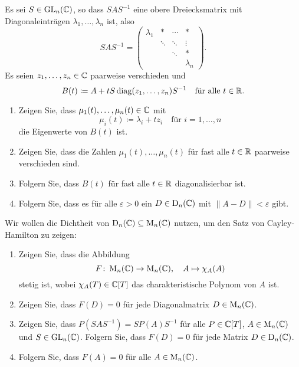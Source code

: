 \documentclass[a4paper,10pt]{scrartcl}
\begin{document}
\begin{question}
  Es sei $S \in \operatorname{GL}_n(\mathbb{C})$, so dass $S A S^{-1}$ eine obere Dreiecksmatrix mit Diagonaleinträgen $\lambda_1, \dotsc, \lambda_n$ ist, also
  \[
    S A S^{-1}
    =
    \begin{pmatrix}
      \lambda_1 & *       & \cdots  & *         \\
                & \ddots  & \ddots  & \vdots    \\
                &         & \ddots  & *         \\
                &         &         & \lambda_n
    \end{pmatrix}.
  \]
  Es seien $z_1, \dotsc, z_n \in \mathbb{C}$ paarweise verschieden und
  \[
    B(t)
    \coloneqq
    A + t S \operatorname{\operatorname{diag}}(z_1, \dotsc, z_n) S^{-1}
    \quad
    \text{für alle $t \in \mathbb{R}$}.
  \]
  \begin{enumerate}
    \item
      Zeigen Sie, dass $\mu_1(t), \dotsc, \mu_n(t) \in \mathbb{C}$ mit
      \[
        \mu_i(t) \coloneqq \lambda_i + t z_i
        \quad
        \text{für $i = 1, \dotsc, n$}
      \]
      die Eigenwerte von $B(t)$ ist.
    \item
      Zeigen Sie, dass die Zahlen $\mu_1(t), \dotsc, \mu_n(t)$ für fast alle $t \in \mathbb{R}$ paarweise verschieden sind.
    \item
      Folgern Sie, dass $B(t)$ für fast alle $t \in \mathbb{R}$ diagonalisierbar ist.
    \item
      Folgern Sie, dass es für alle $\varepsilon > 0$ ein $D \in \operatorname{D}_n(\mathbb{C})$ mit $\| A - D \| < \varepsilon$ gibt.
  \end{enumerate}
  Wir wollen die Dichtheit von $\operatorname{D}_n(\mathbb{C}) \subseteq \operatorname{M}_n(\mathbb{C})$ nutzen, um den Satz von Cayley-Hamilton zu zeigen:
  \begin{enumerate}[resume]
    \item
      Zeigen Sie, dass die Abbildung
      \[
        F \colon \operatorname{M}_n(\mathbb{C}) \to \operatorname{M}_n(\mathbb{C}),
        \quad
        A \mapsto \chi_A(A)
      \]
      stetig ist, wobei $\chi_A(T) \in \mathbb{C}[T]$ das charakteristische Polynom von $A$ ist.
    \item
      Zeigen Sie, dass $F(D) = 0$ für jede Diagonalmatrix $D \in \operatorname{M}_n(\mathbb{C})$.
    \item
      Zeigen Sie, dass $P(SAS^{-1}) = S P(A) S^{-1}$ für alle $P \in \mathbb{C}[T]$, $A \in \operatorname{M}_n(\mathbb{C})$ und $S \in \operatorname{GL}_n(\mathbb{C})$.
      Folgern Sie, dass $F(D) = 0$ für jede Matrix $D \in \operatorname{D}_n(\mathbb{C})$.
    \item
      Folgern Sie, dass $F(A) = 0$ für alle $A \in \operatorname{M}_n(\mathbb{C})$.
  \end{enumerate}
\end{question}
\end{document}
